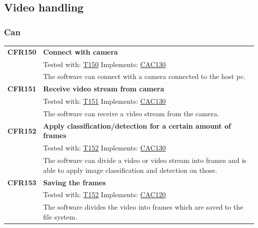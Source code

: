 \documentclass[parskip=full]{scrartcl}
\begin{document}
\subsection{Video handling}
\subsubsection{Can}
\begin{tabular}{p{2cm}p{11.4cm}}
\textbf{CFR150} \hypertarget{CFR150} & \textbf{Connect with camera}\\
& Tested with: \hyperlink{T150}{T150} Implements: \hyperlink{CAC130}{CAC130} \\
& The software can connect with a camera connected to the \gls{host pc}.\\
\textbf{CFR151} \hypertarget{CFR151} & \textbf{Receive video stream from camera}\\
& Tested with: \hyperlink{T151}{T151} Implements: \hyperlink{CAC130}{CAC130}\\
& The software can receive a video stream from the camera.\\
\textbf{CFR152} \hypertarget{CFR152} & \textbf{Apply classification/detection for a certain amount of frames}\\
& Tested with: \hyperlink{T152}{T152} Implements: \hyperlink{CAC130}{CAC130}\\
& The software can divide a video or video stream into frames and is able to apply \gls{image classification} and detection on those.\\
\textbf{CFR153} \hypertarget{CFR153} & \textbf{Saving the frames}\\
& Tested with: \hyperlink{T152}{T152} Implements: \hyperlink{CAC120}{CAC120}\\
& The software divides the video into frames which are saved to the file system.
\end{tabular}
\end{document}
